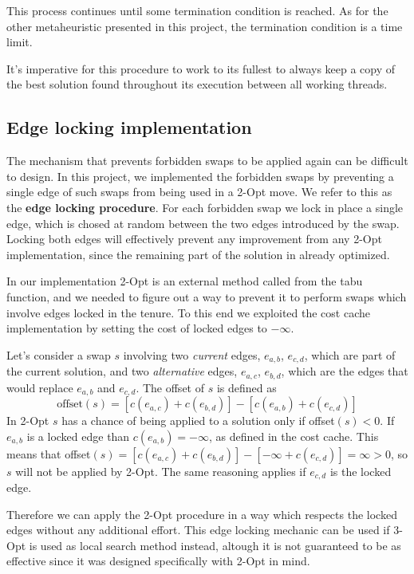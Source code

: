 This process continues until some termination condition is reached.
As for the other metaheuristic presented in this project, the termination condition is a time limit.

It's imperative for this procedure to work to its fullest to always keep a copy of the best solution found throughout its execution between all working threads.

\subsection{Edge locking implementation}

The mechanism that prevents forbidden swaps to be applied again can be difficult to design.
In this project, we implemented the forbidden swaps by preventing a single edge of such swaps from being used in a 2-Opt move.
We refer to this as the \textbf{edge locking procedure}.
For each forbidden swap we lock in place a single edge, which is chosed at random between the two edges introduced by the swap.
Locking both edges will effectively prevent any improvement from any 2-Opt implementation, since the remaining part of the solution in already optimized.

In our implementation 2-Opt is an external method called from the tabu function, and we needed to figure out a way to prevent it to perform swaps which involve edges locked in the tenure.
To this end we exploited the cost cache implementation by setting the cost of locked edges to $-\infty$.

Let's consider a swap $s$ involving two \textit{current} edges, $e_{a,b}$, $e_{c,d}$, which are part of the current solution, and two \textit{alternative} edges, $e_{a,c}$, $e_{b,d}$, which are the edges that would replace $e_{a,b}$ and $e_{c,d}$.
The offset of $s$ is defined as
\[
    \text{offset}(s) = [c(e_{a,c}) + c(e_{b,d})] - [c(e_{a,b}) + c(e_{c,d})]
\]
In 2-Opt $s$ has a chance of being applied to a solution only if offset$(s)<0$.
If $e_{a,b}$ is a locked edge than $c(e_{a,b})=-\infty$, as defined in the cost cache.
This means that offset$(s) = [c(e_{a,c}) + c(e_{b,d})] - [-\infty + c(e_{c,d})] = \infty > 0$, so $s$ will not be applied by 2-Opt.
The same reasoning applies if $e_{c,d}$ is the locked edge.

Therefore we can apply the 2-Opt procedure in a way which respects the locked edges without any additional effort.
This edge locking mechanic can be used if 3-Opt is used as local search method instead, altough it is not guaranteed to be as effective since it was designed specifically with 2-Opt in mind.

